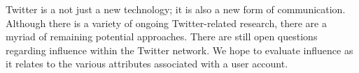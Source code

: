 Twitter is a not just a new technology;  it is also a new form of communication.  Although there is a variety of ongoing Twitter-related research, there are a myriad of remaining potential approaches.  There are still open questions regarding influence within the Twitter network.  We hope to evaluate influence as it relates to the various attributes associated with a user account.  